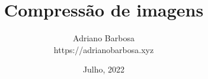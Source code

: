 \documentclass{beamer}
\author[Adriano Barbosa]{Adriano Barbosa\\
https://adrianobarbosa.xyz}
\title{Compress\~ao de imagens}
\date{Julho, 2022}
\begin{document}
\begin{frame}
	\maketitle
\end{frame}

%
%
%
\end{document}

